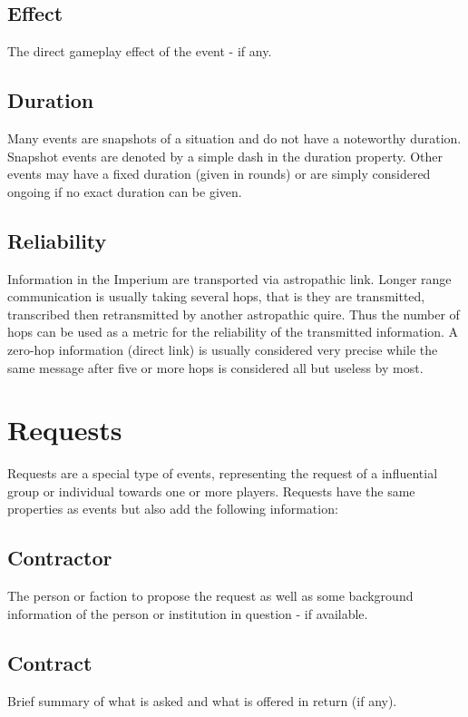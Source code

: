 \subsection{Effect}
The direct gameplay effect of the event - if any.

\subsection{Duration}
Many events are snapshots of a situation and do not have a noteworthy duration. Snapshot events are denoted by a simple dash in the duration property. Other events may have a fixed duration (given in rounds) or are simply considered ongoing if no exact duration can be given.

\subsection{Reliability}
Information in the Imperium are transported via astropathic link. Longer range communication is usually taking several hops, that is they are transmitted, transcribed then retransmitted  by another astropathic quire. Thus the number of hops can be used as a metric for the reliability of the transmitted information. A zero-hop information (direct link) is usually considered very precise while the same message after five or more hops is considered all but useless by most.

\section{Requests}
Requests are a special type of events, representing the request of a influential group or individual towards one or more players. Requests have the same properties as events but also add the following information:

\subsection{Contractor}
The person or faction to propose the request as well as some background information of the person or institution in question - if available.

\subsection{Contract}
Brief summary of what is asked and what is offered in return (if any).


